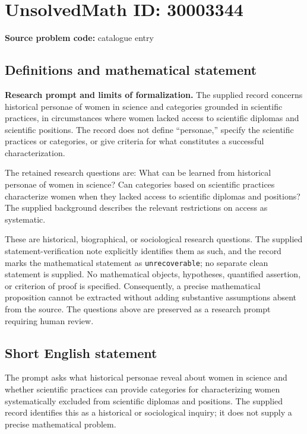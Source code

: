 \documentclass[11pt]{article}
\begin{document}
\section*{UnsolvedMath ID: 30003344}
\textbf{Source problem code:} catalogue entry
\subsection{Definitions and mathematical statement}
\textbf{Research prompt and limits of formalization.} The supplied record concerns historical personae of women in science and categories grounded in scientific practices, in circumstances where women lacked access to scientific diplomas and scientific positions. The record does not define ``personae,'' specify the scientific practices or categories, or give criteria for what constitutes a successful characterization.

The retained research questions are: What can be learned from historical personae of women in science? Can categories based on scientific practices characterize women when they lacked access to scientific diplomas and positions? The supplied background describes the relevant restrictions on access as systematic.

These are historical, biographical, or sociological research questions. The supplied statement-verification note explicitly identifies them as such, and the record marks the mathematical statement as \texttt{unrecoverable}; no separate clean statement is supplied. No mathematical objects, hypotheses, quantified assertion, or criterion of proof is specified. Consequently, a precise mathematical proposition cannot be extracted without adding substantive assumptions absent from the source. The questions above are preserved as a research prompt requiring human review.
\subsection{Short English statement}
The prompt asks what historical personae reveal about women in science and whether scientific practices can provide categories for characterizing women systematically excluded from scientific diplomas and positions. The supplied record identifies this as a historical or sociological inquiry; it does not supply a precise mathematical problem.
\end{document}

